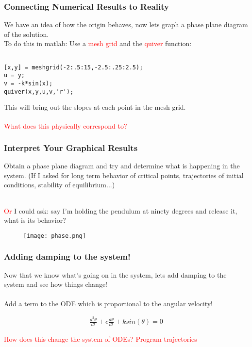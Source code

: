 \documentclass[serif]{beamer}
\begin{document}
\begin{frame}[fragile]
\frametitle{Connecting Numerical Results to Reality}

We have an idea of how the origin behaves, now lets graph a phase plane diagram of the solution. 
\ \\
To do this in matlab: Use a \textcolor{red}{mesh grid} and the \textcolor{red}{quiver} function: \\

\begin{Verbatim} 

[x,y] = meshgrid(-2:.5:15,-2.5:.25:2.5);
u = y;
v = -k*sin(x);
quiver(x,y,u,v,'r');
\end{Verbatim}

This will bring out the slopes at each point in the mesh grid.\\
\ \\
\textcolor{red}{What does this physically correspond to?}
\end{frame}
\begin{frame}
\frametitle{Interpret Your Graphical Results}

Obtain a phase plane diagram and try and determine what is happening in the system. (If I asked for long term behavior of critical points, trajectories of initial conditions, stability of equilibrium...)

\ \\
\textcolor{red}{Or} I could ask: say I'm holding the pendulum at ninety degrees and release it, what is its behavior? 
\begin{figure}
\texttt{[image: phase.png]}
\end{figure}

\end{frame}
%
\begin{frame}
\frametitle{Adding damping to the system!} 

Now that we know what's going on in the system, lets add damping to the system and see how things change! \\
\ \\
Add a term to the ODE which is proportional to the angular velocity! 

\pause

\begin{align*}
\frac{d^2\theta}{dt} + c\frac{d\theta}{dt} + k sin(\theta) = 0
\end{align*}

\textcolor{red}{How does this change the system of ODEs? Program trajectories}
\end{frame}
\end{document}
